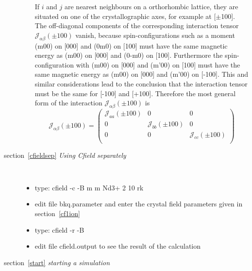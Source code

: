 \documentclass[twoside]{article}
\newcommand{\prg}{\sl}
\begin{document}
\begin{description}
\begin{enumerate}
 If $i$ and $j$ are nearest neighbours on a orthorhombic lattice, they are situated on one of the
 crystallographic axes, for example at [$\pm$100]. The off-diagonal components of the corresponding
 interaction tensor ${\mathcal J}_{\alpha\beta}(\pm100)$ vanish, because spin-configurations such as
 a moment (m00) on [000] and (0m0) on [100] must have the same magnetic energy as (m00) on [000] and
 (0-m0) on [100]. Furthermore the spin-configuration with (m00) on [000] and (m'00) on [100] must
 have the same magnetic energy as (m00) on [000] and (m'00) on [-100]. This and similar
 considerations lead to the conclusion that the interaction tensor must be the same for [-100] and
 [+100]. Therefore the most general form of the interaction ${\mathcal J}_{\alpha\beta}(\pm100)$
 is 
 \begin{equation}
 {\mathcal J}_{\alpha\beta}(\pm100)=\left(
 \begin{array}{ccc}
 {\mathcal J}_{aa}(\pm100) & 0 & 0 \\
 0 & {\mathcal J}_{bb}(\pm100) &  0 \\
 0 & 0 & {\mathcal J}_{cc}(\pm100) \\
 \end{array}
 \right)
 \end{equation}
 \end{enumerate}
\item[section~\ref{cfieldsep} {\em Using {\prg Cfield} separately}] \ 
 \begin{itemize}
 \item type: cfield -c -B m m Nd3+ 2 10 rk
 \item edit file bkq.parameter and enter the crystal field parameters given in section~\ref{cf1ion}
 \item type: cfield -r -B
 \item edit file cfield.output to see the result of the calculation
 \end{itemize}
\item[section~\ref{start} {\em starting a simulation}] \ 


\end{description}
\end{document}
